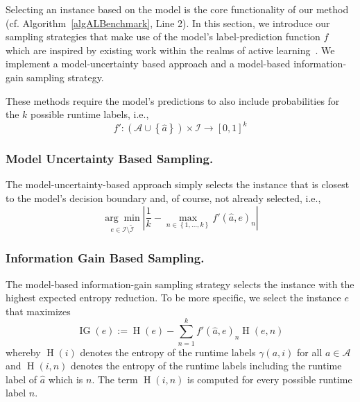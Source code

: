 \documentclass[runningheads]{llncs}
\begin{document}
Selecting an instance based on the model is the core functionality of our method (cf. Algorithm~\ref{algALBenchmark}, Line 2). 
In this section, we introduce our sampling strategies that make use of the model's label-prediction function $f$ which are inspired by existing work within the realms of active learning~\cite{settles2009active}.
We implement a model-uncertainty based approach and a model-based information-gain sampling strategy.

These methods require the model's predictions to also include probabilities for the $k$ possible runtime labels, i.e., 
\begin{equation*}
  f'\!: \left(\mathcal{A} \cup \left\lbrace \hat{a} \right\rbrace\right) \times \mathcal{I} \rightarrow \left[0, 1\right]^k
\end{equation*}

\subsubsection{Model Uncertainty Based Sampling.}

The model-uncertainty-based approach simply selects the instance that is closest to the model's decision boundary and, of course, not already selected, i.e.,
\begin{equation*}
  \underset{e \in \mathcal{I} \setminus \tilde{\mathcal{I}}}{\arg\min} \left\lvert \frac{1}{k} - \max_{n \in \left\lbrace 1, \dots, k \right\rbrace} f'\!\left(\hat{a}, e\right)_{n} \right\rvert
\end{equation*}

\subsubsection{Information Gain Based Sampling.}

The model-based information-gain sampling strategy selects the instance with the highest expected entropy reduction.
To be more specific, we select the instance $e$ that maximizes
\begin{equation*}
  \operatorname{IG}(e) := \operatorname{H}(e) - \sum_{n = 1}^{k} f'(\hat{a}, e)_{n} \operatorname{H}(e, n)
\end{equation*}
whereby $\operatorname{H}\!\left(i\right)$ denotes the entropy of the runtime labels $\gamma\!\left(a, i\right)$ for all $a \in \mathcal{A}$ and $\operatorname{H}\!\left(i, n\right)$ denotes the entropy of the runtime labels including the runtime label of $\hat{a}$ which is $n$.
The term $\operatorname{H}\!\left(i, n\right)$ is computed for every possible runtime label $n$.
\end{document}
